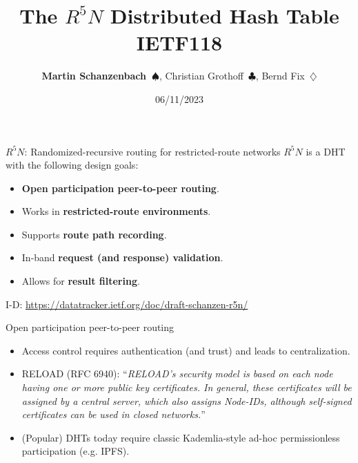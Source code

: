 \documentclass[aspectratio=169]{beamer}
\title{The $R^5N$ Distributed Hash Table\\\small{IETF118}}
\date{06/11/2023}
\author{\textbf{Martin Schanzenbach~$\spadesuit$}, Christian Grothoff~$\clubsuit$, Bernd Fix~$\diamondsuit$}
\institute{$\spadesuit$~Fraunhofer AISEC \url{https://aisec.fraunhofer.de}\\$\clubsuit$~Berner Fachhochschule \url{https://bfh.ch}\\$\diamondsuit$~GNUnet e.V. \url{https://gnunet.org}}
\let\oldemph\textbf
\renewcommand{\textbf}[1]{{\color{mLightBrown}\oldemph{#1}}}
\begin{document}
  \maketitle


\begin{frame}{$R^5N$: Randomized-recursive routing for restricted-route networks}
  $R^5N$ is a DHT with the following design goals:
  \begin{itemize}
    \item \textbf{Open participation peer-to-peer routing}.
    \item Works in \textbf{restricted-route environments}.
    \item Supports \textbf{route path recording}.
    \item In-band \textbf{request (and response) validation}.
    \item Allows for \textbf{result filtering}.
  \end{itemize}
  I-D: \url{https://datatracker.ietf.org/doc/draft-schanzen-r5n/}
\end{frame}

\begin{frame}{Open participation peer-to-peer routing}
  \begin{itemize}
    \item Access control requires authentication (and trust) and leads to centralization.
    \item RELOAD (RFC 6940): ``\textit{RELOAD's security model is based on each node having one or more
   public key certificates.  In general, these certificates will be
   assigned by a central server, which also assigns Node-IDs, although
      self-signed certificates can be used in closed networks.}''
    \item (Popular) DHTs today require classic Kademlia-style ad-hoc permissionless participation (e.g. IPFS).
  \end{itemize}
\end{frame}
\end{document}
